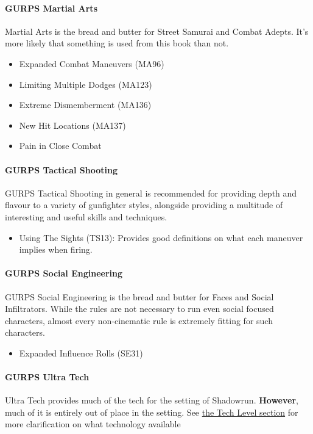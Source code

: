 \begin{multicols*}{3}
	\paragraph{GURPS Martial Arts}
	Martial Arts is the bread and butter for Street Samurai and Combat Adepts. It's more likely that something is used from this book than not.
	
	\begin{itemize}
		\itemsep0em 
		\item Expanded Combat Maneuvers (MA96)
		\item Limiting Multiple Dodges (MA123)
		\item Extreme Dismemberment (MA136)
		\item New Hit Locations (MA137)
		\item Pain in Close Combat
	\end{itemize}
	
	\paragraph{GURPS Tactical Shooting}
	GURPS Tactical Shooting in general is recommended for providing depth and flavour to a variety of gunfighter styles, alongside providing a multitude of interesting and useful skills and techniques.
	\begin{itemize}
		\itemsep0em 
		\item Using The Sights (TS13): Provides good definitions on what each maneuver implies when firing.
	\end{itemize}
	
	\paragraph{GURPS Social Engineering}
	GURPS Social Engineering is the bread and butter for Faces and Social Infiltrators. While the rules are not necessary to run even social focused characters, almost every non-cinematic rule is extremely fitting for such characters.
	\begin{itemize}
		\itemsep0em 
		\item Expanded Influence Rolls (SE31)
	\end{itemize}
	
	\paragraph{GURPS Ultra Tech}
	Ultra Tech provides much of the tech for the setting of Shadowrun. \textbf{However}, much of it is entirely out of place in the setting. See \hyperref[TL]{the Tech Level section} for more clarification on what technology available
	

\end{multicols*}

